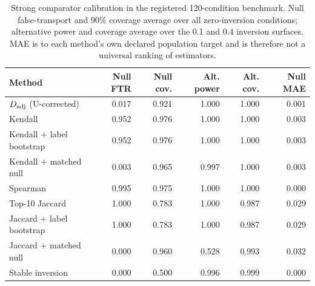 \begin{table}[t]
\centering
\small
\setlength{\tabcolsep}{3.5pt}
\caption{Strong comparator calibration in the registered 120-condition benchmark. Null false-transport and 90\% coverage average over all zero-inversion conditions; alternative power and coverage average over the 0.1 and 0.4 inversion surfaces. MAE is to each method's own declared population target and is therefore not a universal ranking of estimators.}
\label{tab:v3-comparator}
\begin{tabular}{lrrrrr}
\toprule
Method & Null FTR & Null cov. & Alt. power & Alt. cov. & Null MAE \\
\midrule
$D_{\rm adj}$ (U-corrected) & 0.017 & 0.921 & 1.000 & 1.000 & 0.001 \\
Kendall & 0.952 & 0.976 & 1.000 & 1.000 & 0.003 \\
Kendall + label bootstrap & 0.952 & 0.976 & 1.000 & 1.000 & 0.003 \\
Kendall + matched null & 0.003 & 0.965 & 0.997 & 1.000 & 0.003 \\
Spearman & 0.995 & 0.975 & 1.000 & 1.000 & 0.000 \\
Top-10 Jaccard & 1.000 & 0.783 & 1.000 & 0.987 & 0.029 \\
Jaccard + label bootstrap & 1.000 & 0.783 & 1.000 & 0.987 & 0.029 \\
Jaccard + matched null & 0.000 & 0.960 & 0.528 & 0.993 & 0.032 \\
Stable inversion & 0.000 & 0.500 & 0.996 & 0.999 & 0.000 \\
\bottomrule
\end{tabular}
\end{table}
